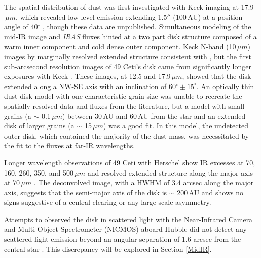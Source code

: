 The spatial distribution of dust was first investigated with Keck imaging at 17.9$\,\mu m$, which revealed low-level emission extending 1.5$''$ (100\,AU) at a position angle of 40$^{\circ}$ \citep{Guil99}, though these data are unpublished. Simultaneous modeling of the mid-IR image and \textit{IRAS} fluxes hinted at a two part disk structure composed of a warm inner component and cold dense outer component. Keck N-band (10$\,\mu m$) images by \cite{Jaya01} marginally resolved extended structure consistent with \citeauthor{Guil99}, but the first sub-arcsecond resolution images of 49 Ceti's disk came from significantly longer exposures with Keck \citep{Wahh07}. These images, at 12.5 and 17.9$\,\mu m$, showed that the disk extended along a NW-SE axis with an inclination of 60$^{\circ} \pm 15^{\circ}$. An optically thin dust disk model with one characteristic grain size was unable to recreate the spatially resolved data and fluxes from the literature, but a model with small grains (a $\sim$ 0.1\,$\mu m$) between 30\,AU and 60\,AU from the star and an extended disk of larger grains (a $\sim$ 15\,$\mu m$) was a good fit. In this model, the undetected outer disk, which contained the majority of the dust mass, was necessitated by the fit to the fluxes at far-IR wavelengths.

Longer wavelength observations of 49 Ceti with Herschel show IR excesses at 70, 160, 260, 350, and 500$\,\mu m$ and resolved extended structure along the major axis at 70$\,\mu m$ \citep{Robe13}. The deconvolved image, with a HWHM of 3.4 arcsec along the major axis, suggests that the semi-major axis of the disk is $\sim$ 200\,AU and shows no signs suggestive of a central clearing or any large-scale asymmetry. 

Attempts to observed the disk in scattered light with the Near-Infrared Camera and Multi-Object Spectrometer (NICMOS) aboard Hubble did not detect any scattered light emission beyond an angular separation of 1.6 arcsec from the central star \citep{Wein99}. This discrepancy will be explored in Section \ref{MidIR}. %


